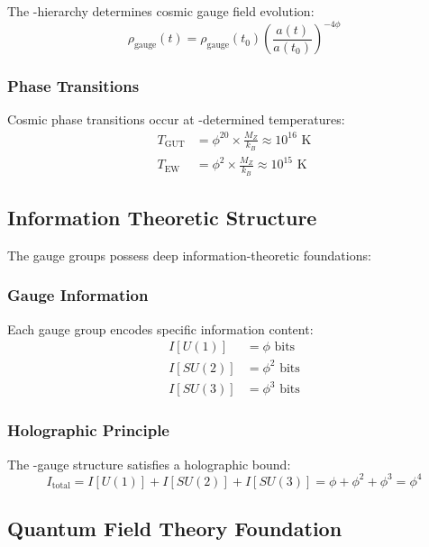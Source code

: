 The \phi-hierarchy determines cosmic gauge field evolution:
\begin{equation}
\rho_{\text{gauge}}(t) = \rho_{\text{gauge}}(t_0) \left(\frac{a(t)}{a(t_0)}\right)^{-4\phi}
\end{equation}

\subsubsection{Phase Transitions}

Cosmic phase transitions occur at \phi-determined temperatures:
\begin{align}
T_{\text{GUT}} &= \phi^{20} \times \frac{M_Z}{k_B} \approx 10^{16} \text{ K} \\
T_{\text{EW}} &= \phi^2 \times \frac{M_Z}{k_B} \approx 10^{15} \text{ K}
\end{align}

\subsection{Information Theoretic Structure}

The gauge groups possess deep information-theoretic foundations:

\subsubsection{Gauge Information}

Each gauge group encodes specific information content:
\begin{align}
I[U(1)] &= \phi \text{ bits} \\
I[SU(2)] &= \phi^2 \text{ bits} \\  
I[SU(3)] &= \phi^3 \text{ bits}
\end{align}

\subsubsection{Holographic Principle}

The \phi-gauge structure satisfies a holographic bound:
\begin{equation}
I_{\text{total}} = I[U(1)] + I[SU(2)] + I[SU(3)] = \phi + \phi^2 + \phi^3 = \phi^4
\end{equation}

\subsection{Quantum Field Theory Foundation}


